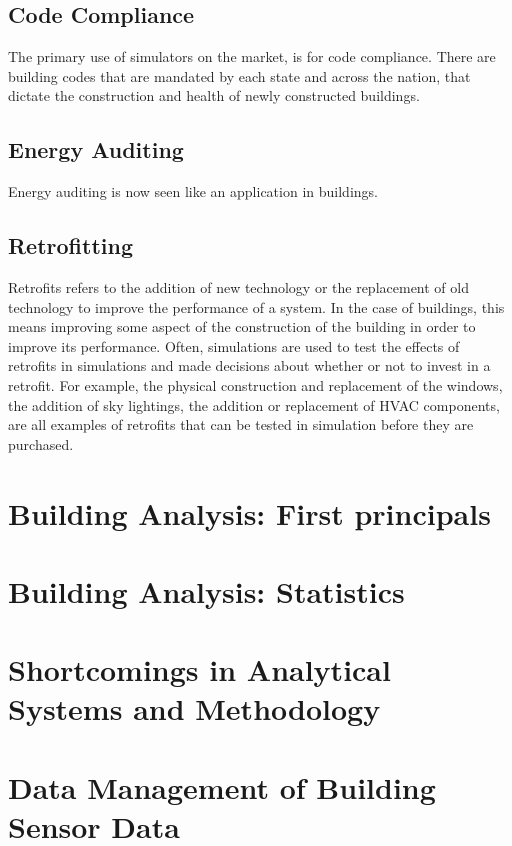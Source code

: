\subsection{Code Compliance}
The primary use of simulators on the market, is for code compliance.  There are building codes that are mandated by each state and across
the nation, that dictate the construction and health of newly constructed buildings.

\subsection{Energy Auditing}
Energy auditing is now seen like an application in buildings.

\subsection{Retrofitting}
Retrofits refers to the addition of new technology or the replacement of old technology to improve the performance of a system.  In the case
of buildings, this means improving some aspect of the construction of the building in order to improve its performance.  Often, simulations
are used to test the effects of retrofits in simulations and made decisions about whether or not to invest in a retrofit.  For example, 
the physical construction and replacement of the windows, the addition of sky lightings, the addition or replacement of HVAC components, are
all examples of retrofits that can be tested in simulation before they are purchased.


\section{Building Analysis: First principals}
\section{Building Analysis: Statistics}

\section{Shortcomings in Analytical Systems and Methodology}

\section{Data Management of Building Sensor Data}
